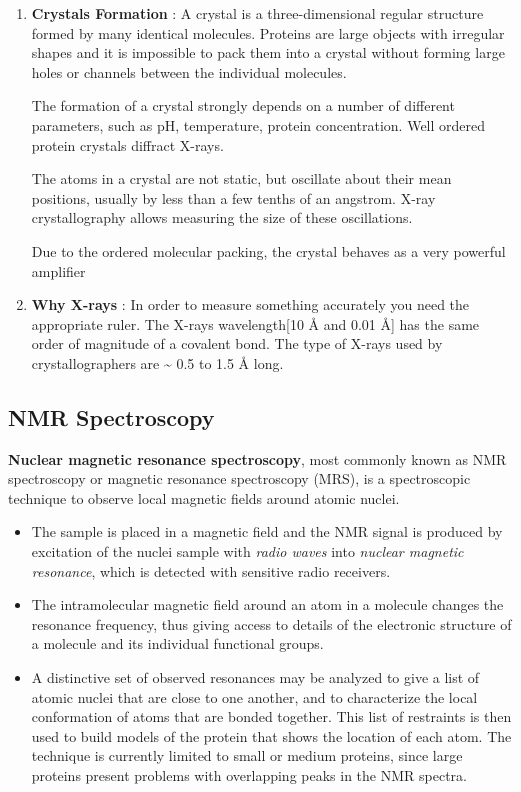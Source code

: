 \documentclass[11pt]{article}
\begin{document}
\begin{enumerate}
\item \textbf{Crystals Formation} : A crystal is a three-dimensional regular structure formed by many
identical molecules. Proteins are large objects with irregular shapes and it is impossible
to pack them into a crystal without forming large holes or channels between the individual
molecules.

The formation of a crystal strongly depends on a number of different parameters, such as
pH, temperature, protein concentration. Well ordered protein crystals diffract X-rays.

The atoms in a crystal are not static, but oscillate about their mean positions, usually by
less than a few tenths of an angstrom. X-ray crystallography allows measuring the size of
these oscillations.

Due to the ordered molecular packing, the crystal behaves as a very powerful amplifier

\item \textbf{Why X-rays} : In order to measure something accurately you need the appropriate ruler. The
X-rays wavelength[10 Å and 0.01 Å] has the same order of magnitude of a covalent bond. The
type of X-rays used by crystallographers are \textasciitilde{} 0.5 to 1.5 Å long.
\end{enumerate}


\subsection{NMR Spectroscopy}
\label{sec:orgb944622}
\textbf{Nuclear magnetic resonance spectroscopy}, most commonly known as NMR spectroscopy or magnetic
resonance spectroscopy (MRS), is a spectroscopic technique to observe local magnetic fields
around atomic nuclei. 

\begin{itemize}
\item The sample is placed in a magnetic field and the NMR signal is produced by excitation of the
nuclei sample with \emph{radio waves} into \emph{nuclear magnetic resonance}, which is detected with
sensitive radio receivers.
\item The intramolecular magnetic field around an atom in a molecule changes the resonance
frequency, thus giving access to details of the electronic structure of a molecule and its
individual functional groups.

\item A distinctive set of observed resonances may be analyzed to give a list of atomic nuclei
that are close to one another, and to characterize the local conformation of atoms that are
bonded together. This list of restraints is then used to build models of the protein that
shows the location of each atom. The technique is currently limited to small or medium
proteins, since large proteins present problems with overlapping peaks in the NMR spectra.
\end{itemize}
\end{document}
